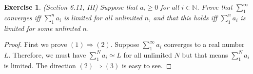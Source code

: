 \documentclass[a4paper, 11pt]{book}
\theoremstyle{plain}
\newtheorem{exercise}{Exercise}[chapter]
\theoremstyle{plain}
\newcommand{\N}{\mathbb{N}}
\begin{document}
  \begin{exercise}
    (Section 6.11, III)
    Suppose that $a_i \geq 0$ for all $i \in \N$. Prove that $\sum_{1}^\infty$ converges iff $\sum_{1}^n a_i$ is limited for all unlimited $n$, and that this holds iff $\sum_{1}^n a_i$ is limited for some unlimted $n$.
  \end{exercise}
  \begin{proof}
    First we prove $(1) \Rightarrow (2)$. Suppose $\sum_{1}^\infty a_i$ converges to a real number $L$. Therefore, we must have $\sum_{1}^N a_i \simeq L$ for all unlimited $N$ but that means $\sum_{1}^N a_i$ is limited. The direction $(2) \Rightarrow (3)$ is easy to see.
  \end{proof}
  
\end{document}
